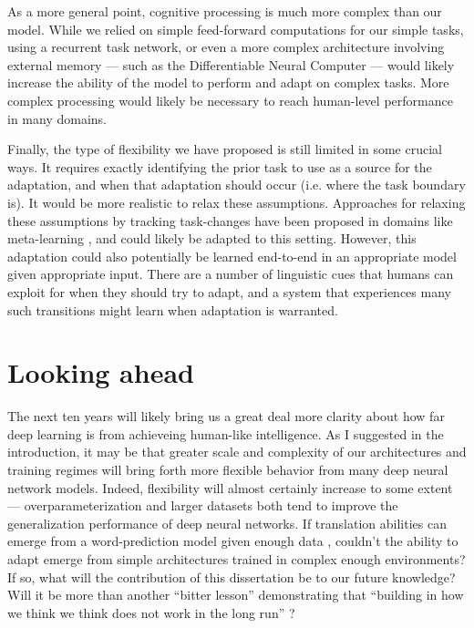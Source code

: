 As a more general point, cognitive processing is much more complex than our model. While we relied on simple feed-forward computations for our simple tasks, using a recurrent task network, or even a more complex architecture involving external memory --- such as the Differentiable Neural Computer \citep{Graves2016} --- would likely increase the ability of the model to perform and adapt on complex tasks. More complex processing would likely be necessary to reach human-level performance in many domains.\par 

Finally, the type of flexibility we have proposed is still limited in some crucial ways. It requires exactly identifying the prior task to use as a source for the adaptation, and when that adaptation should occur (i.e. where the task boundary is). It would be more realistic to relax these assumptions. Approaches for relaxing these assumptions by tracking task-changes have been proposed in domains like meta-learning \citep[e.g.][]{Nagabandi2019}, and could likely be adapted to this setting. However, this adaptation could also potentially be learned end-to-end in an appropriate model given appropriate input. There are a number of linguistic cues that humans can exploit for when they should try to adapt, and a system that experiences many such transitions might learn when adaptation is warranted. \par 


\section{Looking ahead}

The next ten years will likely bring us a great deal more clarity about how far deep learning is from achieveing human-like intelligence. As I suggested in the introduction, it may be that greater scale and complexity of our architectures and training regimes will bring forth more flexible behavior from many deep neural network models. Indeed, flexibility will almost certainly increase to some extent --- overparameterization and larger datasets both tend to improve the generalization performance of deep neural networks. If translation abilities can emerge from a word-prediction model given enough data \citep{Radford2019}, couldn't the ability to adapt emerge from simple architectures trained in complex enough environments? If so, what will the contribution of this dissertation be to our future knowledge? Will it be more than another ``bitter lesson'' demonstrating that ``building in how we think we think does not work in the long run'' \citep{Sutton2019}? \par 


